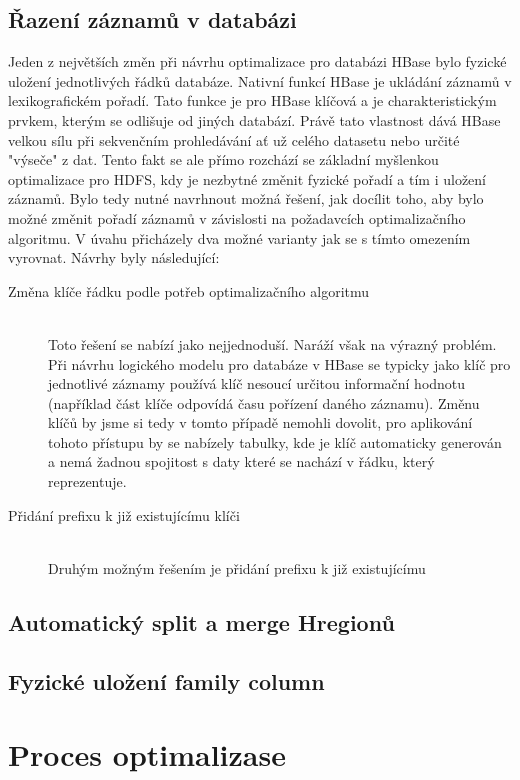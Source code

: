 \documentclass[thesis=M,czech]{FITthesis}[2012/06/26]
\begin{document}
\subsection{Řazení záznamů v databázi}
Jeden z největších změn při návrhu optimalizace pro databázi HBase bylo fyzické uložení jednotlivých řádků databáze. Nativní funkcí HBase je ukládání záznamů v lexikografickém pořadí. Tato funkce je pro HBase klíčová a je charakteristickým prvkem, kterým se odlišuje od jiných databází. Právě tato vlastnost dává HBase velkou sílu při sekvenčním prohledávání ať už celého datasetu nebo určité "výseče" z dat. Tento fakt se ale přímo rozchází se základní myšlenkou optimalizace pro HDFS, kdy je nezbytné změnit fyzické pořadí a tím i uložení záznamů. Bylo tedy nutné navrhnout možná řešení, jak docílit toho, aby bylo možné změnit pořadí záznamů v závislosti na požadavcích optimalizačního algoritmu. V úvahu přicházely dva možné varianty jak se s tímto omezením vyrovnat. Návrhy byly následující:
\begin{description}
\item[Změna klíče řádku podle potřeb optimalizačního algoritmu] \hfill \\
 Toto řešení se nabízí jako nejjednoduší. Naráží však na výrazný problém. Při návrhu logického modelu pro databáze v HBase se typicky jako klíč pro jednotlivé záznamy používá klíč nesoucí určitou informační hodnotu (například část klíče odpovídá času pořízení daného záznamu). Změnu klíčů by jsme si tedy v tomto případě nemohli dovolit, pro aplikování tohoto přístupu by se nabízely tabulky, kde je klíč automaticky generován a nemá žadnou spojitost s daty které se nachází v řádku, který reprezentuje.
 
 \item[Přidání prefixu k již existujícímu klíči] \hfill \\
 Druhým možným řešením je přidání prefixu k již existujícímu 
 
\end{description} 

\subsection{Automatický split a merge Hregionů}
\subsection{Fyzické uložení family column}

\section{Proces optimalizase}
\end{document}
